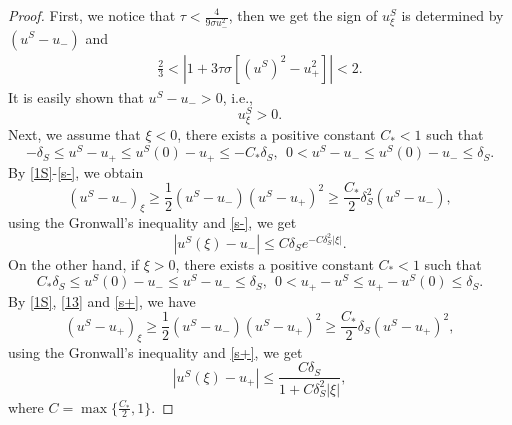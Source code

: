 \documentclass[10pt,reqno]{amsart}
\numberwithin{equation}{section}
\begin{document}
	\begin{proof}
		First, we notice that $\tau<\frac{4}{9\sigma u_{-}^2}$, then we get the sign of $u^S_{\xi}$ is determined by $(u^S-u_{-})$ and 
		\begin{align}\label{13}
			\frac{2}{3}<\left|1+3\tau \sigma\left[(u^{S})^{2}-u_{+}^{2}\right]\right|<2.
		\end{align}
		It is easily shown that $u^S-u_{-}>0$, i.e.,  $$u^S_{\xi}>0.$$
		Next, we assume that $\xi<0$, there exists a positive constant $C_{*}<1$ such that 
		\begin{equation}\label{s-}
			-\delta_{S}\leq u^S-u_{+}\leq u^S(0)-u_{+}\leq -C_{*}\delta_{S},\ \ 
			0< u^S-u_{-}\leq u^S(0)-u_{-}\leq \delta_{S}.
		\end{equation}
		By \eqref{1S}-\eqref{s-}, we obtain
		$$\left(u^S-u_{-}\right)_{\xi}\geq \frac{1}{2}(u^S-u_{-})(u^S-u_{+})^2\geq\frac{C_{*}}{2}\delta_{S}^2(u^S-u_{-}),$$
		using the Gronwall's inequality and \eqref{s-}, we get
		$$\left|u^S(\xi)-u_{-}\right| \leq C \delta_S e^{-C \delta_S^2|\xi|}.$$
		On the other hand, if $\xi>0$, there exists a positive constant $C_{*}<1$ such that 
		\begin{equation}\label{s+}
			C_{*}\delta_{S}\leq u^S(0)-u_{-}\leq u^S-u_{-}\leq\delta_{S}  ,\ \ 
			0< u_{+}-u^S\leq u_{+}-u^S(0)\leq \delta_{S}.
		\end{equation}
		By \eqref{1S}, \eqref{13} and \eqref{s+}, we have
		$$(u^S-u_{+})_{\xi}\geq \frac{1}{2}(u^S-u_{-})(u^S-u_{+})^2\geq\frac{C_{*}}{2} \delta_{S}(u^S-u_{+})^2,$$
		using the Gronwall's inequality and \eqref{s+}, we get 
		$$\left|u^S(\xi)-u_{+}\right| \leq \frac{C \delta_S}{1+C \delta_S^2|\xi|},$$
		where $C=\max\{\frac{C_{*}}{2},1\}.$ 
		

\end{proof}
\end{document}

